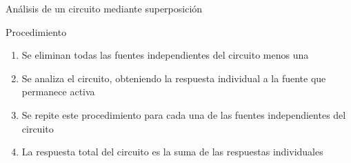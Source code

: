 \documentclass[aspectratio=169, xcolor={usenames,svgnames,dvipsnames}]{beamer}
\begin{document}

\begin{frame}{Análisis de un circuito mediante superposición}
    \begin{block}{Procedimiento}
    \vspace{1mm}
    
    \begin{enumerate}
        \item Se \alert{eliminan} todas las \alert{fuentes independientes} del circuito menos una
        \vspace{1mm}
        
        \vspace{2mm}
        
        \item Se analiza el circuito, obteniendo la \alert{respuesta individual} a la fuente que permanece activa
        \vspace{2mm}
        
        \item Se repite este procedimiento para \alert{cada una de las fuentes independientes} del circuito
        \vspace{2mm}
        
        \item La respuesta total del circuito es la \alert{suma de las respuestas individuales}
    \end{enumerate}
    \vspace{1mm}
    \end{block}
\end{frame}

\end{document}
